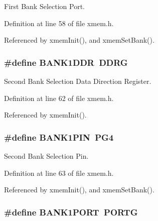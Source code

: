 First Bank Selection Port. 



Definition at line 58 of file xmem.\-h.



Referenced by xmem\-Init(), and xmem\-Set\-Bank().

\hypertarget{group__xmem_gada13cb9312072b48628763a6e1fd50d3}{
\subsubsection[{B\-A\-N\-K1\-D\-D\-R}]{\setlength{\rightskip}{0pt plus 5cm}\#define B\-A\-N\-K1\-D\-D\-R~D\-D\-R\-G}}\label{group__xmem_gada13cb9312072b48628763a6e1fd50d3}


Second Bank Selection Data Direction Register. 



Definition at line 62 of file xmem.\-h.



Referenced by xmem\-Init().

\hypertarget{group__xmem_gacfebedc2067e3c52e6ae1f627afcc1e1}{
\subsubsection[{B\-A\-N\-K1\-P\-I\-N}]{\setlength{\rightskip}{0pt plus 5cm}\#define B\-A\-N\-K1\-P\-I\-N~P\-G4}}\label{group__xmem_gacfebedc2067e3c52e6ae1f627afcc1e1}


Second Bank Selection Pin. 



Definition at line 63 of file xmem.\-h.



Referenced by xmem\-Init(), and xmem\-Set\-Bank().

\hypertarget{group__xmem_ga8b3ee7126196f6e939989eae097c3ac4}{
\subsubsection[{B\-A\-N\-K1\-P\-O\-R\-T}]{\setlength{\rightskip}{0pt plus 5cm}\#define B\-A\-N\-K1\-P\-O\-R\-T~P\-O\-R\-T\-G}}\label{group__xmem_ga8b3ee7126196f6e939989eae097c3ac4}


